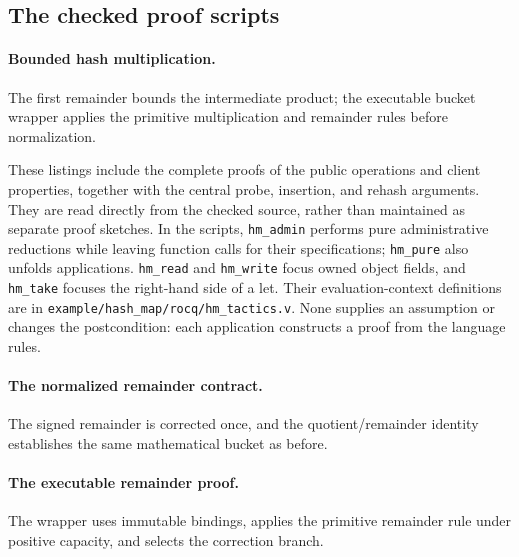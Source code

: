 \documentclass[11pt]{article}
\begin{document}
\subsection{The checked proof scripts}

\paragraph{Bounded hash multiplication.} The first remainder bounds the
intermediate product; the executable bucket wrapper applies the primitive
multiplication and remainder rules before normalization.




These listings include the complete proofs of the public operations and client
properties, together with the central probe, insertion, and rehash arguments.
They are read directly from the checked source, rather than maintained as
separate proof sketches. In the scripts, \texttt{hm\_admin} performs pure
administrative reductions while leaving function calls for their specifications;
\texttt{hm\_pure} also unfolds applications. \texttt{hm\_read} and
\texttt{hm\_write} focus owned object fields, and \texttt{hm\_take} focuses the
right-hand side of a let. Their evaluation-context definitions are in
\texttt{example/hash\_map/rocq/hm\_tactics.v}. None supplies an assumption or
changes the postcondition: each application constructs a proof from the
language rules.\par
\paragraph{The normalized remainder contract.} The signed remainder is corrected once, and the quotient/remainder identity establishes the same mathematical bucket as before.



\paragraph{The executable remainder proof.} The wrapper uses immutable bindings, applies the primitive remainder rule under positive capacity, and selects the correction branch.


\end{document}
